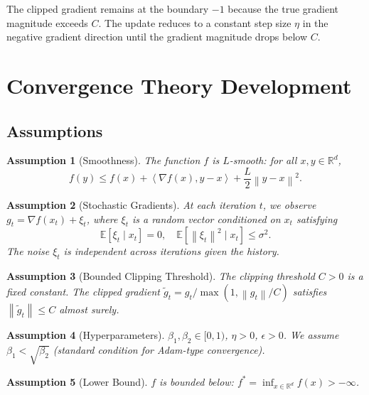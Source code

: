 \documentclass{article}
\newtheorem{assumption}{Assumption}
\newcommand{\R}{\mathbb{R}}
\newcommand{\E}{\mathbb{E}}
\newcommand{\norm}[1]{\left\| #1 \right\|}
\newcommand{\inner}[2]{\left\langle #1, #2 \right\rangle}
\begin{document}
The clipped gradient remains at the boundary $-1$ because the true gradient magnitude exceeds $C$. The update reduces to a constant step size $\eta$ in the negative gradient direction until the gradient magnitude drops below $C$.

\section*{Convergence Theory Development}

\subsection*{Assumptions}
\begin{assumption}[Smoothness] \label{assump:smooth}
    The function $f$ is $L$-smooth: for all $x, y \in \R^d$,
    \[
        f(y) \le f(x) + \inner{\nabla f(x)}{y-x} + \frac{L}{2} \norm{y-x}^2.
    \]
\end{assumption}

\begin{assumption}[Stochastic Gradients] \label{assump:stochastic}
    At each iteration $t$, we observe $g_t = \nabla f(x_t) + \xi_t$, where $\xi_t$ is a random vector conditioned on $x_t$ satisfying
    \[
        \E[\xi_t \mid x_t] = 0, \quad \E[\norm{\xi_t}^2 \mid x_t] \le \sigma^2.
    \]
    The noise $\xi_t$ is independent across iterations given the history.
\end{assumption}

\begin{assumption}[Bounded Clipping Threshold] \label{assump:clipping}
    The clipping threshold $C > 0$ is a fixed constant. The clipped gradient $\tilde{g}_t = g_t / \max(1, \norm{g_t}/C)$ satisfies $\norm{\tilde{g}_t} \le C$ almost surely.
\end{assumption}

\begin{assumption}[Hyperparameters] \label{assump:hyper}
    $\beta_1, \beta_2 \in [0,1)$, $\eta > 0$, $\epsilon > 0$. We assume $\beta_1 < \sqrt{\beta_2}$ (standard condition for Adam-type convergence).
\end{assumption}

\begin{assumption}[Lower Bound] \label{assump:lower}
    $f$ is bounded below: $f^* = \inf_{x \in \R^d} f(x) > -\infty$.
\end{assumption}
\end{document}
